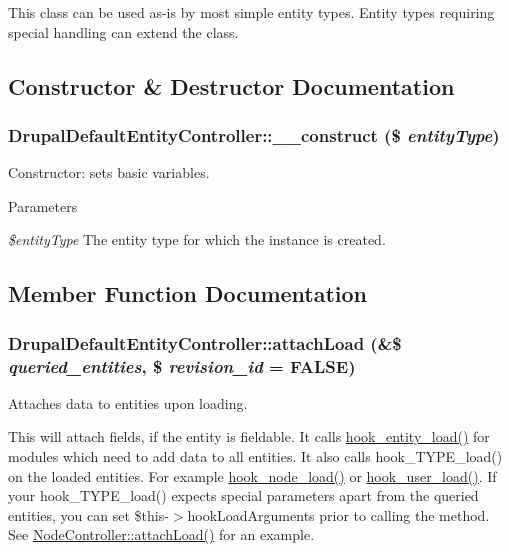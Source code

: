 This class can be used as-\/is by most simple entity types. Entity types requiring special handling can extend the class. 

\subsection{Constructor \& Destructor Documentation}
\hypertarget{classDrupalDefaultEntityController_ae25e238e38c76dc784040ae8ad9cfc9c}{
\subsubsection[{\_\-\_\-construct}]{\setlength{\rightskip}{0pt plus 5cm}DrupalDefaultEntityController::\_\-\_\-construct (\$ {\em entityType})}}
\label{classDrupalDefaultEntityController_ae25e238e38c76dc784040ae8ad9cfc9c}
Constructor: sets basic variables.


\begin{DoxyParams}{Parameters}
\item[{\em \$entityType}]The entity type for which the instance is created. \end{DoxyParams}


\subsection{Member Function Documentation}
\hypertarget{classDrupalDefaultEntityController_a68735c41d2ba655a073c64983754edf7}{
\subsubsection[{attachLoad}]{\setlength{\rightskip}{0pt plus 5cm}DrupalDefaultEntityController::attachLoad (\&\$ {\em queried\_\-entities}, \/  \$ {\em revision\_\-id} = {\ttfamily FALSE})}}
\label{classDrupalDefaultEntityController_a68735c41d2ba655a073c64983754edf7}
Attaches data to entities upon loading.

This will attach fields, if the entity is fieldable. It calls \hyperlink{group__hooks_ga1f594647c8cbb27f75b77cc4118da8d6}{hook\_\-entity\_\-load()} for modules which need to add data to all entities. It also calls hook\_\-TYPE\_\-load() on the loaded entities. For example \hyperlink{group__node__api__hooks_gad48bb14b68ed38526029d1f7ac2d2de4}{hook\_\-node\_\-load()} or \hyperlink{group__hooks_ga81027843e38de3a899fa6e72f876d6b6}{hook\_\-user\_\-load()}. If your hook\_\-TYPE\_\-load() expects special parameters apart from the queried entities, you can set \$this-\/$>$hookLoadArguments prior to calling the method. See \hyperlink{classNodeController_abdc7525854d61d63fa6ee79bb2409359}{NodeController::attachLoad()} for an example.


